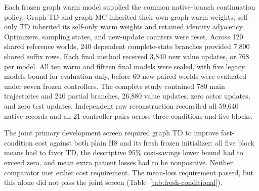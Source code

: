 \documentclass[preprint,review,12pt]{elsarticle}
\begin{document}
Each frozen graph warm model supplied the common native-branch continuation
policy. Graph TD and graph MC inherited their own graph warm weights;
self-only TD inherited its self-only warm weights and retained identity
adjacency. Optimizers, sampling states, and new-update counters were reset.
Across 120 shared reference worlds, 240 dependent complete-state branches
provided 7,800 shared suffix rows. Each final method received 3,840 new value
updates, or 768 per model. All ten warm and fifteen final models were sealed,
with five legacy models bound for evaluation only, before 60 new paired
worlds were evaluated under seven frozen controllers. The complete study
contained 780 main trajectories and 240 partial branches, 26,880 value updates,
zero actor updates, and zero test updates. Independent raw reconstruction
reconciled all 59,640 native records and all 21 controller pairs across three
conditions and five blocks.

The joint primary development screen required graph TD to improve fast-condition
cost against both plain H8 and its fresh frozen initializer: all five block
means had to favor TD, the descriptive 95\% cost-savings lower bound had to
exceed zero, and mean extra patient losses had to be nonpositive. Neither
comparator met either cost requirement. The mean-loss requirement passed,
but this alone did not pass the joint screen (Table~\ref{tab:fresh-conditional}).
\end{document}
